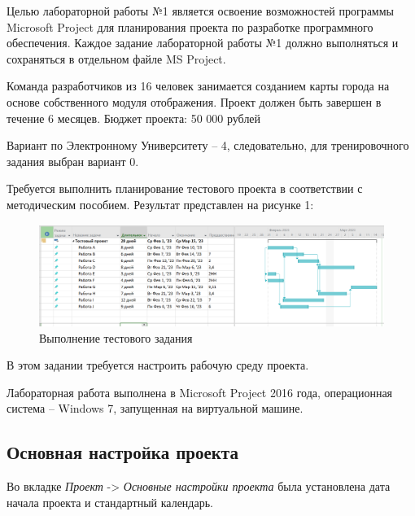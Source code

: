 Целью лабораторной работы №1 является освоение возможностей программы Microsoft Project для планирования проекта по разработке программного обеспечения.
Каждое задание лабораторной работы №1 должно выполняться и сохраняться в отдельном файле MS Project.

Команда разработчиков из 16 человек занимается созданием карты города на основе собственного модуля отображения. 
Проект должен быть завершен в течение 6 месяцев. Бюджет проекта: 50 000 рублей

Вариант по Электронному Университету -- 4, следовательно, для тренировочного задания выбран вариант 0.

Требуется выполнить планирование тестового проекта в соответствии с методическим пособием.
Результат представлен на рисунке 1:
\FloatBarrier
\begin{figure}[h]	
	\begin{center}
		\includegraphics[width=\linewidth]{inc/test.png}
	\end{center}
	\captionsetup{justification=centering}
	\caption{Выполнение тестового задания}
\end{figure}
\FloatBarrier


\newpage
{}
В этом задании требуется настроить рабочую среду проекта.

Лабораторная работа выполнена в Microsoft Project 2016 года, операционная система -- Windows 7, запущенная на виртуальной машине.

\subsection*{Основная настройка проекта}
Во вкладке \textit{Проект} -> \textit{Основные настройки проекта} была установлена дата начала проекта и стандартный календарь.

